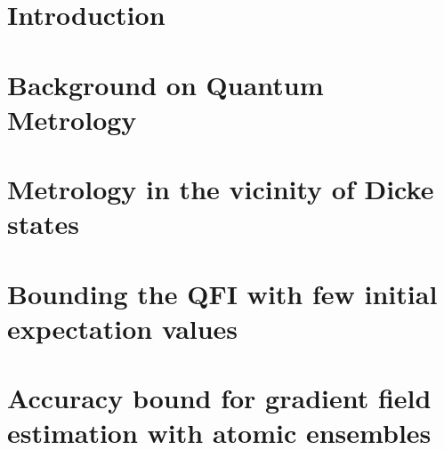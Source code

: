 \documentclass[12pt, letterpaper, twoside]{article}
\numberwithin{equation}{section}
\numberwithin{figure}{section}
\numberwithin{table}{section}
\begin{document}
\cleardoublepage


\renewcommand{\rightmark}{\bf \thesubsection}
\renewcommand{\headrulewidth}{0.5pt}
\fancyfoot[LE,RO]{\thepage}
\fancyhead[LE]{Section: \rightmark} %
\fancyhead[RO]{\leftmark}



\section{Introduction}




\section[Backgroud on Quantum Metrology]
{Background on Quantum Metrology}




\section[Quantum metrology with Dike like states]
{Metrology in the vicinity of Dicke states}




\section[Bounds on QFI with observables]
{Bounding the QFI with few initial expectation values}





\section[Metrology of the gradient magnetic field]
{Accuracy bound for gradient field estimation with atomic ensembles}




\end{document}
